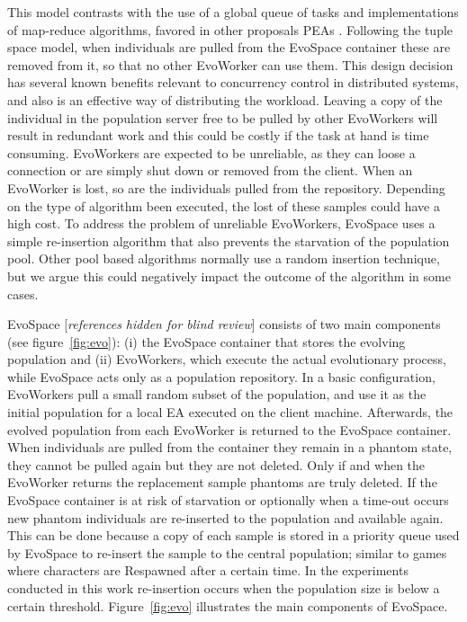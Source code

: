 \documentclass{sig-alternate}
\begin{document}
This model contrasts with the use of a global queue of tasks and
implementations of map-reduce algorithms, favored in other proposals PEAs
\cite{fazenda2012,di2013towards,FlexGP}.
Following the tuple space model, when individuals are pulled from the EvoSpace
container these are removed from it, so that no other EvoWorker can use them.
This design decision has several known benefits relevant to concurrency control 
in distributed systems, and also is an effective way of distributing the workload.
Leaving a copy of the individual in the population server free to be pulled by other EvoWorkers will result in redundant work and this could be
costly if the task at hand is time consuming. EvoWorkers are expected to be 
unreliable, as they can loose a connection or are simply shut down or removed 
from the client. When an EvoWorker is lost, so are the individuals pulled from
the repository. Depending on the type of algorithm been executed, the lost of
these samples could have a high cost. To address the problem of unreliable 
EvoWorkers, EvoSpace uses a simple re-insertion algorithm that also 
prevents the starvation of the population pool. Other pool based algorithms
normally use a random insertion technique, but we argue this could negatively 
impact the outcome of the algorithm in some cases.



EvoSpace [{\em references hidden for blind review}] consists of two main components (see figure~\ref{fig:evo}): (i) the EvoSpace 
container that stores the evolving population and (ii) EvoWorkers, which execute 
the actual evolutionary process, while EvoSpace acts only as a population repository.
In a basic configuration, EvoWorkers pull a small random subset of the 
population, and use it as the initial population for a local EA executed 
on the client machine. Afterwards, the evolved population from each EvoWorker 
is returned to the EvoSpace container. When individuals are pulled from the 
container they remain in a phantom state, they cannot be pulled again but 
they are not deleted. Only if and when the EvoWorker returns the replacement 
sample phantoms are truly deleted. If the EvoSpace container is at risk of 
starvation or optionally when a time-out occurs new phantom individuals are 
re-inserted to the population and available again. This can be done because a 
copy of each sample is stored in a priority queue used by EvoSpace to re-insert 
the sample to the central population; similar to games where characters are 
Respawned after a certain time. In the experiments conducted in this work 
re-insertion occurs when the population size is below a certain threshold. 
Figure~\ref{fig:evo} illustrates the main components of EvoSpace.
\end{document}
